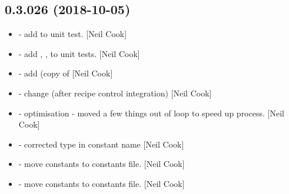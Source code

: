 \documentclass[a4paper,10pt,english]{report}
\begin{document}
\subsection{0.3.026 (2018-10-05)}
\label{\detokenize{misc/changelog:id305}}\begin{itemize}
\item {} 
 - add  to unit test. {[}Neil Cook{]}

\item {} 
 - add , ,
 to unit tests. {[}Neil Cook{]}

\item {} 
 - add  (copy of 
{[}Neil Cook{]}

\item {} 
 - change  (after recipe control
integration) {[}Neil Cook{]}

\item {} 
 - optimisation - moved a few things out of loop to
speed up process. {[}Neil Cook{]}

\item {} 
 - corrected type in constant name
 {[}Neil Cook{]}

\item {} 
 - move  constants to
constants file. {[}Neil Cook{]}

\item {} 
 - move constants to constants file. {[}Neil Cook{]}

\end{itemize}
\end{document}
